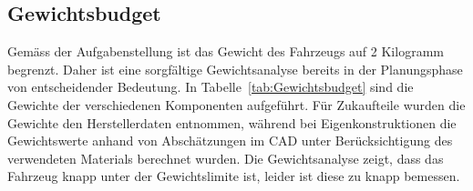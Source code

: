 \documentclass[main.tex]{subfiles} %
\begin{document}
\subsection{Gewichtsbudget}

Gemäss der Aufgabenstellung ist das Gewicht des Fahrzeugs auf 2 Kilogramm
begrenzt. Daher ist eine sorgfältige Gewichtsanalyse bereits in der
Planungsphase von entscheidender Bedeutung. In Tabelle~\ref{tab:Gewichtsbudget}
sind die Gewichte der verschiedenen Komponenten aufgeführt. Für Zukaufteile
wurden die Gewichte den Herstellerdaten entnommen, während bei
Eigenkonstruktionen die Gewichtswerte anhand von Abschätzungen im CAD unter
Berücksichtigung des verwendeten Materials berechnet wurden. Die
Gewichtsanalyse zeigt, dass das Fahrzeug knapp unter der Gewichtslimite ist,
leider ist diese zu knapp bemessen.
\end{document}

